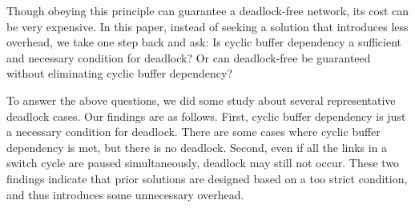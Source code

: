 Though obeying this principle can guarantee a deadlock-free network, its cost can be very expensive. In this paper, instead of seeking a solution that introduces less overhead, we take one step back and ask: Is cyclic buffer dependency a sufficient and necessary condition for deadlock? Or can deadlock-free be guaranteed without eliminating cyclic buffer dependency?

To answer the above questions, we did some study about several representative deadlock cases. Our findings are as follows. First, cyclic buffer dependency is just a necessary condition for deadlock. There are some cases where cyclic buffer dependency is met, but there is no deadlock. Second, even if all the links in a switch cycle are paused simultaneously, deadlock may still not occur. These two findings indicate that prior solutions are designed based on a too strict condition, and thus introduces some unnecessary overhead. 


